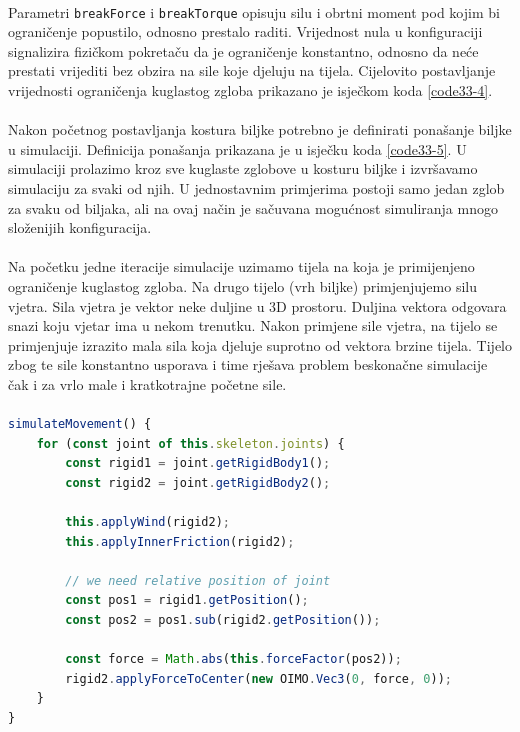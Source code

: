 \documentclass[times, utf8, diplomski]{fer}
\begin{document}
\paragraph{}
Parametri \verb#breakForce# i \verb#breakTorque# opisuju silu i obrtni moment pod kojim bi
ograničenje popustilo, odnosno prestalo raditi. Vrijednost nula u konfiguraciji signalizira
fizičkom pokretaču da je ograničenje konstantno, odnosno da neće prestati vrijediti bez 
obzira na sile koje djeluju na tijela. Cijelovito postavljanje vrijednosti ograničenja 
kuglastog zgloba prikazano je isječkom koda \ref{code33-4}.

\paragraph{}
Nakon početnog postavljanja kostura biljke potrebno je definirati ponašanje biljke u 
simulaciji. Definicija ponašanja prikazana je u isječku koda \ref{code33-5}. U simulaciji
prolazimo kroz sve kuglaste zglobove u kosturu biljke i izvršavamo simulaciju za svaki od 
njih. U jednostavnim primjerima postoji samo jedan zglob za svaku od biljaka, ali na ovaj 
način je sačuvana mogućnost simuliranja mnogo složenijih konfiguracija.

\paragraph{}
Na početku jedne iteracije simulacije uzimamo tijela na koja je primijenjeno ograničenje
kuglastog zgloba. Na drugo tijelo (vrh biljke) primjenjujemo silu vjetra. Sila vjetra 
je vektor neke duljine u 3D prostoru. Duljina vektora odgovara snazi koju vjetar ima u nekom 
trenutku. Nakon primjene sile vjetra, na tijelo se primjenjuje izrazito mala sila koja 
djeluje suprotno od vektora brzine tijela. Tijelo zbog te sile konstantno usporava i 
time rješava problem beskonačne simulacije čak i za vrlo male i kratkotrajne početne sile.

\paragraph{}
\begin{lstlisting}[language=Javascript,label=code33-5,caption=Fizička simulacija ponašanja biljke.]
simulateMovement() {
	for (const joint of this.skeleton.joints) {
		const rigid1 = joint.getRigidBody1();
		const rigid2 = joint.getRigidBody2();

		this.applyWind(rigid2);
		this.applyInnerFriction(rigid2);

		// we need relative position of joint
		const pos1 = rigid1.getPosition();
		const pos2 = pos1.sub(rigid2.getPosition());

		const force = Math.abs(this.forceFactor(pos2));
		rigid2.applyForceToCenter(new OIMO.Vec3(0, force, 0));
	}
}
\end{lstlisting}
\end{document}
